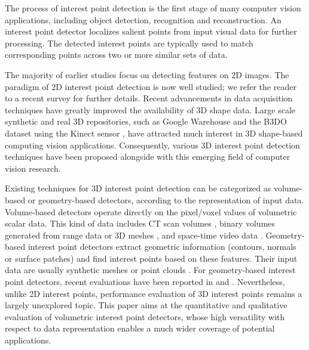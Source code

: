 The process of interest point detection is the first stage of many computer vision applications, including object detection, recognition and reconstruction. An interest point detector localizes salient points from input visual data for further processing. The detected interest points are typically used to match corresponding points across two or more similar sets of data. 

The majority of earlier studies focus on detecting features on 2D images. The paradigm of 2D interest point detection is now
well studied; we refer the reader to a recent survey \cite{Tuytelaars2008} for further details. 
Recent advancements in data acquisition techniques have greatly improved the availability of 3D shape data. 
Large scale synthetic and real 3D repositories, such as Google Warehouse \cite{Lai2010} and the B3DO dataset using the Kinect sensor \cite{Janoch2011}, have attracted much interest in 3D shape-based computing vision applications. Consequently, various 3D interest point detection techniques have been proposed alongside with this emerging field of computer vision research. 

Existing techniques for 3D interest point detection can be categorized as volume-based or geometry-based detectors, according to the representation of input data. Volume-based detectors operate directly on the pixel/voxel values of volumetric scalar data. This kind of data includes CT scan volumes \cite{Flitton2010}, binary volumes generated from range data \cite{Viksten2008} or 3D meshes \cite{Knopp2010}, and space-time video data \cite{Koelstra2009,Laptev2005,Willems2008,Yu2010}. Geometry-based interest point detectors extract geometric information (\eg contours, normals or surface patches) and find interest points based on these features. Their input data are usually synthetic meshes \cite{Glomb2009,Sipiran2011,Zaharescu2009} or point clouds \cite{Unnikrishnan2008,Aanaes2012}. For geometry-based interest point detectors, recent evaluations have been reported in \cite{Salti2011} and \cite{Dutagaci2011}.  
Nevertheless, unlike 2D interest points, performance evaluation of 3D interest points remains a largely unexplored topic. 
This paper aims at the quantitative and qualitative evaluation of volumetric interest point detectors, whose high versatility with respect to data representation enables a much wider coverage of potential applications.

